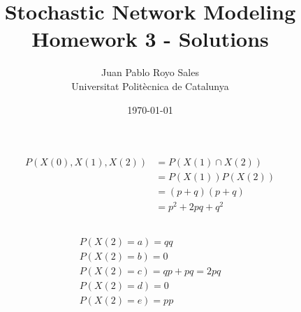 \documentclass[12pt, a4paper]{article}
\title{%
  Stochastic Network Modeling \\
  Homework 3 - Solutions
}
\author{%
  Juan Pablo Royo Sales\\
  \small{Universitat Politècnica de Catalunya}
}
\date\today
\begin{document}
\maketitle

\section{}
\subsection{}

\begin{subequations}
  \begin{align}
    P(X(0),X(1),X(2)) &= P(X(1) \cap X(2))\\
                      &= P(X(1))P(X(2))\\
                      &= (p+q)(p+q)\\
                      &= p^2 + 2pq + q^2
  \end{align}
\end{subequations}

\subsection{}

\begin{subequations}
  \begin{align}
    P(X(2)=a) = qq\\
    P(X(2)=b) = 0\\
    P(X(2)=c) = qp + pq = 2pq\\
    P(X(2)=d) = 0\\
    P(X(2)=e) = pp\\
  \end{align}
\end{subequations}

\section{}
\subsection{}
\end{document}
